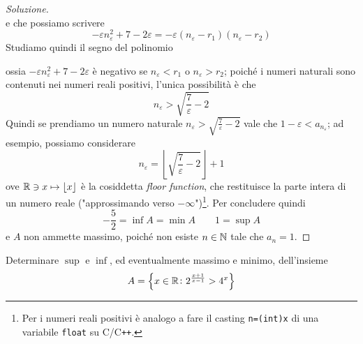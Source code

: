 \begin{proof}[Soluzione]
\[    \]
    e che possiamo scrivere
    \[
    -\varepsilon n_\varepsilon^2 +7-2\varepsilon = -\varepsilon(n_\varepsilon-r_1)(n_\varepsilon-r_2)
    \]
    Studiamo quindi il segno del polinomio
    \begin{center}
    \end{center}
    ossia $-\varepsilon n_\varepsilon^2+7-2\varepsilon$ è negativo se $n_\varepsilon <r_1$ o $n_\varepsilon> r_2$; poiché i numeri naturali sono contenuti nei numeri reali positivi, l'unica possibilità è che
    \[
    n_\varepsilon > \sqrt{\frac{7}{\varepsilon}-2}
    \]
    Quindi se prendiamo un numero naturale $n_\varepsilon > \sqrt{\frac{7}{\varepsilon}-2}$ vale che $1-\varepsilon <a_{n_\varepsilon}$; ad esempio, possiamo considerare
    \[
    n_\varepsilon = \left\lfloor\sqrt{\frac{7}{\varepsilon}-2}\right\rfloor+1
    \]
    ove $\amsbb{R}\ni x \mapsto \lfloor x \rfloor$ è la cosiddetta \emph{floor function}, che restituisce la parte intera di un numero reale ("approssimando verso $-\infty$")\footnote{Per i numeri reali positivi è analogo a fare il casting \texttt{n=(int)x} di una variabile \texttt{float} su C/C\texttt{++}.}. Per concludere quindi
    \[
    -\frac{5}{2} = \inf A = \min A \qquad 1 = \sup A
    \]
    e $A$ non ammette massimo, poiché non esiste $n\in\amsbb{N}$ tale che $a_n = 1$.
\end{proof}
\begin{exercise}
    \label{ex:2.3}
    Determinare $\sup$ e $\inf$, ed eventualmente massimo e minimo, dell'insieme
    \[
    A = \left\{ x\in\amsbb{R} \colon 2^{\frac{x+1}{x-1}}>4^x\right\}
    \]
\end{exercise}
